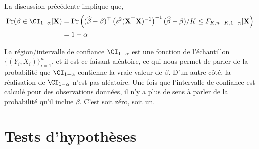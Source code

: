La discussion précédente implique que,
\begin{align*}
\Pr(\beta \in \CI_{1-\alpha}|\mathbf{X}) &=\Pr\left( (\widehat{\beta}-\beta)^\top\left(s^2(\mathbf{X}^\top\mathbf{X})^{-1}\right)^{-1}(\widehat{\beta}-\beta)/K \leq F_{K, n-K, 1-\alpha} | \mathbf{X}\right)\\
&=1-\alpha 
\end{align*}
\begin{remarque}
La région/intervalle de confiance $\CI_{1-\alpha}$ est une fonction de l'échantillon $\{(Y_i, X_i)\}_{i=1}^n$, et il est ce faisant aléatoire, ce qui nous permet de parler de la probabilité que $\CI_{1-\alpha}$ contienne la vraie valeur de $\beta$. D'un autre côté, la réalisation de $\CI_{1-\alpha}$ n'est pas aléatoire. Une fois que l'intervalle de confiance est calculé pour des observations données, il n'y a plus de sens à parler de la probabilité qu'il inclue $\beta$. C'est soit zéro, soit un.
\end{remarque}

\section{Tests d'hypothèses}

